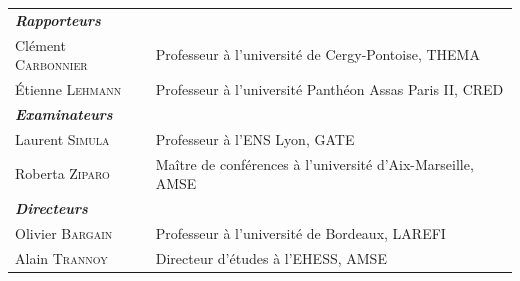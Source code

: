 \small
\begin{tabular}{ll}
\itshape \bfseries Rapporteurs &   \\
Clément \textsc{Carbonnier}     & Professeur à l'université de Cergy-Pontoise, THEMA\\
Étienne \textsc{Lehmann}  &   Professeur à l'université Panthéon Assas Paris II, CRED \\
\itshape \bfseries Examinateurs  &     \\
Laurent \textsc{Simula} & Professeur à l'ENS Lyon, GATE\\
Roberta \textsc{Ziparo} & Ma\^itre de conférences à l'université d'Aix-Marseille, AMSE\\

\itshape \bfseries Directeurs  &   \\
Olivier \textsc{Bargain} &   Professeur à l'université de Bordeaux, LAREFI \\
Alain \textsc{Trannoy}   &   Directeur d’études à l'EHESS, AMSE \\ 
\end{tabular}
\normalsize








\cleardoublepage


\cleardoublepage



%




\vspace{-4cm}


\renewcommand*\contentsname{}
\setcounter{tocdepth}{2} 
\tableofcontents
\listoftables
\listoffigures


\ifx\isEmbedded\undefined
\newpage

\else \fi


